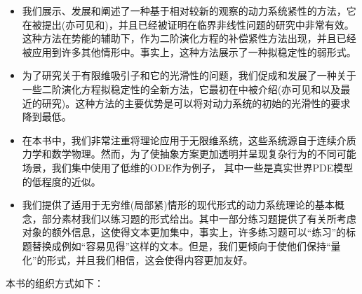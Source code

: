 \begin{itemize}
	\item 我们展示、发展和阐述了一种基于相对较新的观察的动力系统紧性的方法，它在\cite{Khanmamedov06}被提出(亦可见\cite{Chueshov08}和\cite{Chueshov10})，并且已经被证明在临界非线性问题的研究中非常有效。这种方法在势能的辅助下，作为二阶演化方程的补偿紧性方法出现，并且已经被应用到许多其他情形中。事实上，这种方法展示了一种拟稳定性的弱形式。
	\item 为了研究关于有限维吸引子和它的光滑性的问题，我们促成和发展了一种关于一些二阶演化方程拟稳定性的全新方法，它最初在\cite{Chueshov04}中被介绍(亦可见\cite{Chueshov08}和\cite{Chueshov10}以及最近的研究\cite{Chueshov13})。这种方法的主要优势是可以将对动力系统的初始的光滑性的要求降到最低。
	\item 在本书中，我们非常注重将理论应用于无限维系统，这些系统源自于连续介质力学和数学物理。然而，为了使抽象方案更加透明并呈现复杂行为的不同可能场景，我们集中使用了低维的ODE作为例子， 其中一些是真实世界PDE模型的低程度的近似。
	\item 我们提供了适用于无穷维(局部紧)情形的现代形式的动力系统理论的基本概念，部分素材我们以练习题的形式给出。其中一部分练习题提供了有关所考虑对象的额外信息，这使得文本更加集中，事实上，许多练习题可以“练习”的标题替换成例如“容易见得”这样的文本。但是，我们更倾向于使他们保持“量化”的形式，并且我们相信，这会使得内容更加友好。
\end{itemize}

本书的组织方式如下：